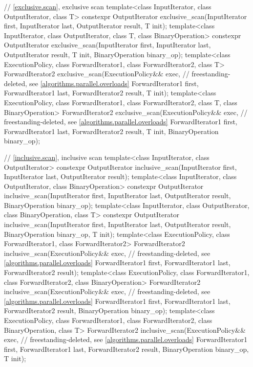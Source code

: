 \begin{codeblock}
{  // \ref{exclusive.scan}, exclusive scan
  template<class InputIterator, class OutputIterator, class T>
    constexpr OutputIterator
      exclusive_scan(InputIterator first, InputIterator last,
                     OutputIterator result, T init);
  template<class InputIterator, class OutputIterator, class T, class BinaryOperation>
    constexpr OutputIterator
      exclusive_scan(InputIterator first, InputIterator last,
                     OutputIterator result, T init, BinaryOperation binary_op);
  template<class ExecutionPolicy, class ForwardIterator1, class ForwardIterator2, class T>
    ForwardIterator2
      exclusive_scan(ExecutionPolicy&& exec,                    // freestanding-deleted, see \ref{algorithms.parallel.overloads}
                     ForwardIterator1 first, ForwardIterator1 last,
                     ForwardIterator2 result, T init);
  template<class ExecutionPolicy, class ForwardIterator1, class ForwardIterator2, class T,
           class BinaryOperation>
    ForwardIterator2
      exclusive_scan(ExecutionPolicy&& exec,                    // freestanding-deleted, see \ref{algorithms.parallel.overloads}
                     ForwardIterator1 first, ForwardIterator1 last,
                     ForwardIterator2 result, T init, BinaryOperation binary_op);

  // \ref{inclusive.scan}, inclusive scan
  template<class InputIterator, class OutputIterator>
    constexpr OutputIterator
      inclusive_scan(InputIterator first, InputIterator last,
                     OutputIterator result);
  template<class InputIterator, class OutputIterator, class BinaryOperation>
    constexpr OutputIterator
      inclusive_scan(InputIterator first, InputIterator last,
                     OutputIterator result, BinaryOperation binary_op);
  template<class InputIterator, class OutputIterator, class BinaryOperation, class T>
    constexpr OutputIterator
      inclusive_scan(InputIterator first, InputIterator last,
                     OutputIterator result, BinaryOperation binary_op, T init);
  template<class ExecutionPolicy, class ForwardIterator1, class ForwardIterator2>
    ForwardIterator2
      inclusive_scan(ExecutionPolicy&& exec,                    // freestanding-deleted, see \ref{algorithms.parallel.overloads}
                     ForwardIterator1 first, ForwardIterator1 last,
                     ForwardIterator2 result);
  template<class ExecutionPolicy, class ForwardIterator1, class ForwardIterator2,
           class BinaryOperation>
    ForwardIterator2
      inclusive_scan(ExecutionPolicy&& exec,                    // freestanding-deleted, see \ref{algorithms.parallel.overloads}
                     ForwardIterator1 first, ForwardIterator1 last,
                     ForwardIterator2 result, BinaryOperation binary_op);
  template<class ExecutionPolicy, class ForwardIterator1, class ForwardIterator2,
           class BinaryOperation, class T>
    ForwardIterator2
      inclusive_scan(ExecutionPolicy&& exec,                    // freestanding-deleted, see \ref{algorithms.parallel.overloads}
                     ForwardIterator1 first, ForwardIterator1 last,
                     ForwardIterator2 result, BinaryOperation binary_op, T init);

}
\end{codeblock}
